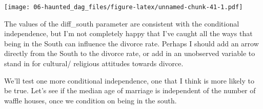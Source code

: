 \documentclass[
]{book}
\newenvironment{Shaded}{\begin{snugshade}}{\end{snugshade}}
\newcommand{\AttributeTok}[1]{\textcolor[rgb]{0.77,0.63,0.00}{#1}}
\newcommand{\DecValTok}[1]{\textcolor[rgb]{0.00,0.00,0.81}{#1}}
\newcommand{\FloatTok}[1]{\textcolor[rgb]{0.00,0.00,0.81}{#1}}
\newcommand{\FunctionTok}[1]{\textcolor[rgb]{0.00,0.00,0.00}{#1}}
\newcommand{\NormalTok}[1]{#1}
\newcommand{\OtherTok}[1]{\textcolor[rgb]{0.56,0.35,0.01}{#1}}
\newcommand{\SpecialCharTok}[1]{\textcolor[rgb]{0.00,0.00,0.00}{#1}}
\begin{document}
\texttt{[image: 06-haunted\_dag\_files/figure-latex/unnamed-chunk-41-1.pdf]}

The values of the diff\_south parameter are consistent with the conditional independence, but I'm not completely happy that I've caught all the ways that being in the South can influence the divorce rate. Perhaps I should add an arrow directly from the South to the divorce rate, or add in an unobserved variable to stand in for cultural/ religious attitudes towards divorce.

We'll test one more conditional independence, one that I think is more likely to be true. Let's see if the median age of marriage is independent of the number of waffle houses, once we condition on being in the south.

\begin{Shaded}
\end{Shaded}
\end{document}
